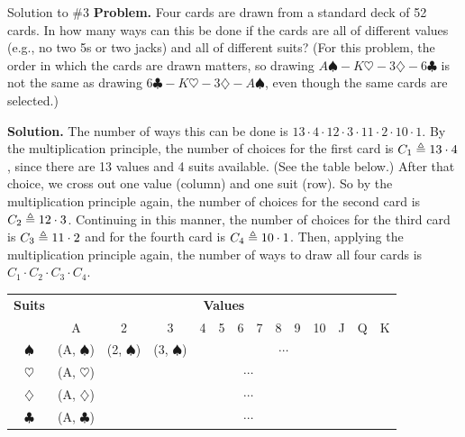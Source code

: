\documentclass[10pt]{beamer}
\begin{document}
\begin{frame}{Solution to \#3}
\footnotesize 
\textbf{Problem.} Four cards are drawn from a standard deck of 52 cards. In how many ways can this be done if the cards are all of different values (e.g., no two 5s or two jacks) and all of different suits?  (For this problem, the order in which the cards are drawn matters, so drawing $A \spadesuit-K \heartsuit - 3 \diamondsuit - 6 \clubsuit$ is not the same as drawing $6 \clubsuit -K \heartsuit - 3 \diamondsuit - A \spadesuit$, even though the same cards are selected.) 

\vfill 

\textbf{Solution.} The number of ways this can be done is $13 \cdot 4 \cdot 12 \cdot 3 \cdot 11 \cdot 2 \cdot 10 \cdot 1$. By the multiplication principle, the number of choices for the first card is $C_1 \triangleq 13 \cdot 4$, since there are 13 values and 4 suits available.  (See the table below.)  After that choice, we cross out one value (column) and one suit (row).  So by the multiplication principle again, the number of choices for the second card is $C_2 \triangleq  12 \cdot 3$.  Continuing in this manner, the number of choices for the third card is $C_3 \triangleq  11 \cdot 2$ and for the fourth card is $C_4 \triangleq  10 \cdot 1$.   Then, applying the multiplication principle again, the number of ways to draw all four cards is $C_1 \cdot C_2 \cdot C_3 \cdot C_4$.


\vfill 

\begin{table}
\centering
\begin{tabular}{c|ccccccccccccc}
\textbf{Suits} & \multicolumn{13}{c}{\textbf{Values}} \\
& A & 2 & 3 & 4 & 5 & 6 & 7 & 8 & 9 & 10 & J & Q & K \\
\hline 
$\spadesuit$ & (A, $\spadesuit$) & (2, $\spadesuit$)  & (3, $\spadesuit$)  &  \multicolumn{9}{c}{$\cdots$}  \\
$\heartsuit$  & (A, $\heartsuit$) &  \multicolumn{12}{c}{$\cdots$} \\
$\diamondsuit$ & (A, $\diamondsuit$) &  \multicolumn{12}{c}{$\cdots$} \\
$\clubsuit$ &  (A, $\clubsuit$) &  \multicolumn{12}{c}{$\cdots$} \\
\end{tabular}
\end{table}



\end{frame}
\end{document}
